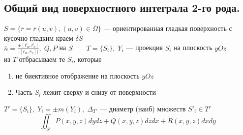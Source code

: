 \documentclass{letnab}
\begin{document}
\subsection{Общий вид поверхностного интеграла 2-го рода.}
$ S = \{ \overline{r} = \overline{r}(u,v), (u,v) \in \overline{\Omega} \} $ --- ориентированная гладкая поверхность с кусочно гладким краем $ \delta S $ \\
$ \overline{n} = \frac{\pm [\overline{r_u},\overline{r_v}]}{|[\overline{r_u},\overline{r_v}]|},\; Q, P  $ на $ S\qquad T = \{S_i \},\; Y_i $ --- проекция $ S_i $ на плоскость $ yOz $\\
из $ T $ отбрасываем те $ S_i $, которые 
\begin{enumerate}
	\item не биективное отображение на плоскость $ yOz $
	\item Часть $ S_i $ лежит сверху и снизу от поверхности 
\end{enumerate}
$ T' = \{S_i \},\; Y_i = \pm m(Y_i),\; \Delta_{T'} $ --- диаметр (наиб) множеств $ S'_i \in T' $
\[
\iint_S P(x,y,z) dydz + Q(x,y,z)dzdx + R(x,y,z)dxdy
\]
\end{document}
